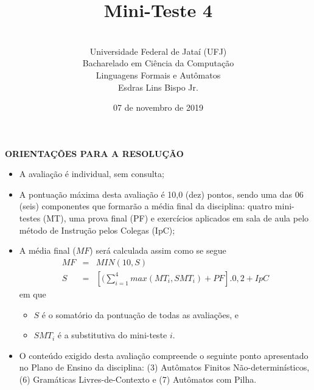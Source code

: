 \documentclass[12pt,a4paper,oneside]{article}
\author{\\Universidade Federal de Jataí (UFJ)\\Bacharelado em Ciência da Computação \\Linguagens Formais e Autômatos \\Esdras Lins Bispo Jr.}
\date{07 de novembro de 2019}
\title{\sc \huge Mini-Teste 4}
\begin{document}
\maketitle

{\bf ORIENTAÇÕES PARA A RESOLUÇÃO}

\small
 
\begin{itemize}
	\item A avaliação é individual, sem consulta;
	\item A pontuação máxima desta avaliação é 10,0 (dez) pontos, sendo uma das 06 (seis) componentes que formarão a média final da disciplina: quatro mini-testes (MT), uma prova final (PF) e exercícios aplicados em sala de aula pelo método de Instrução pelos Colegas (IpC);
	\item A média final ($MF$) será calculada assim como se segue
	\begin{eqnarray}
		MF & = & MIN(10, S) \nonumber \\
		S & = & [(\sum_{i=1}^{4} max(MT_i, SMT_i ) + PF].0,2  + IpC\nonumber
	\end{eqnarray}
	em que 
	\begin{itemize}
		\item $S$ é o somatório da pontuação de todas as avaliações, e
		\item $SMT_i$ é a substitutiva do mini-teste $i$.
	\end{itemize}
	\item O conteúdo exigido desta avaliação compreende o seguinte ponto apresentado no Plano de Ensino da disciplina: (3) Autômatos Finitos Não-determinísticos, (6) Gramáticas Livres-de-Contexto e (7) Autômatos com Pilha.
\end{itemize}

\begin{center}
\end{center}

\newpage
\end{document}
